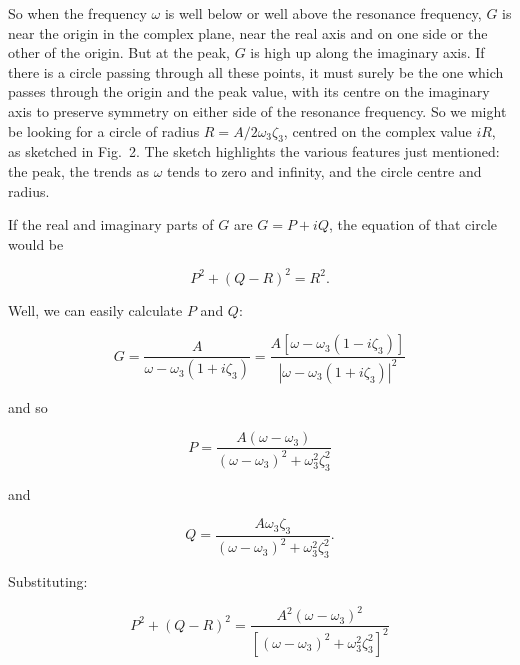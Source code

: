   So when the frequency $\omega$ is well below or well above the resonance 
  frequency, $G$ is near the origin in the complex plane, near the real axis 
  and on one side or the other of the origin. But at the peak, $G$ is high up 
  along the imaginary axis. If there is a circle passing through all these 
  points, it must surely be the one which passes through the origin and the 
  peak value, with its centre on the imaginary axis to preserve symmetry on 
  either side of the resonance frequency. So we might be looking for a circle 
  of radius $R=A/2\omega_3 \zeta_3$, centred on the complex value $iR$, as 
  sketched in Fig.\ 2. The sketch highlights the various features just 
  mentioned: the peak, the trends as $\omega$ tends to zero and infinity, and 
  the circle centre and radius. 


  If the real and imaginary parts of $G$ are $G=P+iQ$, the equation of that 
  circle would be 

  \begin{equation*}P^2 + (Q-R)^2 = R^2. \tag{22}\end{equation*} 

  Well, we can easily calculate $P$ and $Q$: 

  
  \begin{equation*}G=\dfrac{A}{\omega-\omega_3(1+i\zeta_3)}=\dfrac{A[\omega-\omega_3(1-i\zeta_3)]}{|\omega-\omega_3(1+i\zeta_3)|^2} 
  \tag{23}\end{equation*} 

  \noindent{}and so 

  \begin{equation*}P=\dfrac{A(\omega-\omega_3)}{(\omega-\omega_3)^2 + 
  \omega_3^2 \zeta_3^2} \tag{24}\end{equation*} 

  \noindent{}and 

  \begin{equation*}Q=\dfrac{A\omega_3\zeta_3}{(\omega-\omega_3)^2 + \omega_3^2 
  \zeta_3^2} . \tag{25}\end{equation*} 

  Substituting: 

  \begin{equation*}P^2 + (Q-R)^2 = 
  \dfrac{A^2(\omega-\omega_3)^2}{[(\omega-\omega_3)^2 + \omega_3^2 
  \zeta_3^2]^2}\end{equation*} 

